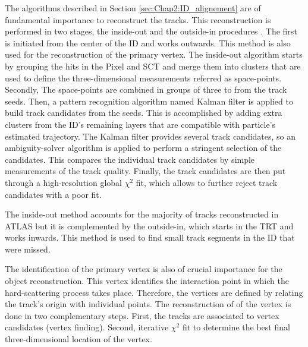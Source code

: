 The algorithms described in Section \ref{sec:Chap2:ID_alignement}
are of fundamental importance to reconstruct the tracks.
This reconstruction is performed in two stages, the inside-out and the outside-in 
procedures \cite{ATLAS:2017kyn}\cite{Cornelissen:2008zzc}. 
The first is initiated from the center of the ID and works outwards. 
This method is also used for the reconstruction of the primary vertex.
The inside-out algorithm starts by grouping the hits in the Pixel and SCT 
and merge them into clusters that are used to define the three-dimensional
measurements referred as space-points.  Secondly, The space-points are
combined in groups of three to from the track seeds. Then, a pattern recognition
algorithm named Kalman filter \cite{Fruhwirth:1987fm} is applied to build track
candidates from the seeds. This is accomplished by adding extra clusters from 
the ID's remaining layers that are compatible with particle's estimated trajectory.
The Kalman filter provides several track candidates, so an ambiguity-solver algorithm
is applied to perform a stringent selection of the candidates. This compares the
individual track candidates by simple measurements of the track quality.
Finally,  the track candidates are then put through a high-resolution global $\chi^2$ fit,
which allows to further reject track candidates with a poor fit.

The inside-out method accounts for the majority of tracks reconstructed in ATLAS but it 
is complemented by the outside-in, which 
starts in the TRT and works inwards. This method is used to find small track segments
in the ID that were missed. 

The identification of the primary vertex is also of crucial importance
for the object reconstruction. This vertex identifies the interaction point
in which the hard-scattering process takes place. Therefore, the vertices are
defined by relating the track's origin with individual points. The reconstruction of
of the vertex is done in two complementary steps. First, the tracks are associated to
vertex candidates (vertex finding). Second, iterative $\chi^2$ fit to determine the
best final three-dimensional location of the vertex. 

 



